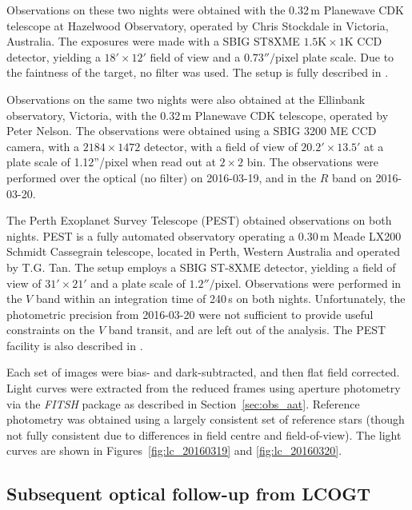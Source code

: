 \documentclass[iop,useAMES,usenatbig]{emulateapj}
\begin{document}
Observations on these two nights were obtained with the 0.32\,m Planewave CDK telescope at Hazelwood Observatory, operated by Chris Stockdale in Victoria, Australia. The exposures were made with a SBIG ST8XME $1.5\mathrm{K}\times1 \mathrm{K}$ CCD detector, yielding a $18'\times12'$ field of view and a $0.73''/\mathrm{pixel}$ plate scale. Due to the faintness of the target, no filter was used. The setup is fully described in \citet{2015arXiv150908953R}.

Observations on the same two nights were also obtained at the Ellinbank observatory, Victoria, with the 0.32\,m Planewave CDK telescope, operated by Peter Nelson. The observations were obtained using a SBIG 3200 ME CCD camera, with a $2184\times1472$ detector, with a field of view of $20.2' \times 13.5'$ at a plate scale of 1.12''/pixel when read out at $2\times 2$ bin. The observations were performed over the optical (no filter) on 2016-03-19, and in the $R$ band on 2016-03-20. 

The Perth Exoplanet Survey Telescope (PEST) obtained observations on both nights. PEST is a fully automated observatory operating a 0.30\,m Meade LX200 Schmidt Cassegrain telescope, located in Perth, Western Australia and operated by T.G. Tan. The setup employs a SBIG ST-8XME detector, yielding a field of view of $31'\times 21'$ and a plate scale of $1.2''/\mathrm{pixel}$. Observations were performed in the $V$ band within an integration time of 240\,s on both nights. Unfortunately, the photometric precision from 2016-03-20 were not sufficient to provide useful constraints on the $V$ band transit, and are left out of the analysis. The PEST facility is also described in \citet{2015arXiv150908953R}.

Each set of images were bias- and dark-subtracted, and then flat field corrected. Light curves were extracted from the reduced frames using aperture photometry via the \emph{FITSH} package as described in Section~\ref{sec:obs_aat}. Reference photometry was obtained using a largely consistent set of reference stars (though not fully consistent due to differences in field centre and field-of-view). The light curves are shown in Figures~\ref{fig:lc_20160319} and \ref{fig:lc_20160320}. 


\subsection{Subsequent optical follow-up from LCOGT}
\label{sec:lcogt}
\end{document}
